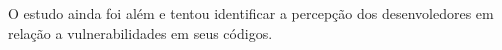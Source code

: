 








O estudo ainda foi além e tentou identificar a percepção dos desenvoledores em relação a vulnerabilidades em seus códigos. 

